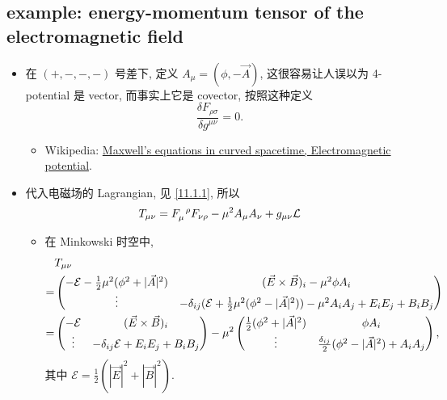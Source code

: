\subsection{example: energy-momentum tensor of the electromagnetic field} \label{subsection D.4.1}
\begin{itemize}
	\item 在 $(+, -, -, -)$ 号差下, 定义 $A_\mu = (\phi, - \vec{A})$, 这很容易让人误以为 4-potential 是 vector, 而事实上它是 covector, 按照这种定义
	\begin{equation}
		\frac{\delta F_{\rho \sigma}}{\delta g^{\mu \nu}} = 0.
	\end{equation}
	\begin{itemize}
		\item Wikipedia: \href{https://en.wikipedia.org/wiki/Maxwell%27s_equations_in_curved_spacetime#Electromagnetic_potential}{Maxwell's equations in curved spacetime, Electromagnetic potential}.
	\end{itemize}
	
	\item 代入电磁场的 Lagrangian, 见 \eqref{11.1.1}, 所以
	\begin{equation}
		T_{\mu \nu} = \tensor{F}{_\mu^\rho} F_{\nu \rho} - \mu^2 A_\mu A_\nu + g_{\mu \nu} \mathcal{L}
	\end{equation}
	
	\begin{itemize}
		\item 在 Minkowski 时空中,
		\begin{align}
			& T_{\mu \nu} \notag \\
			=& \begin{pmatrix}
				- \mathcal{E} - \frac{1}{2} \mu^2 (\phi^2 + |\vec{A}|^2) & (\vec{E} \times \vec{B})_i - \mu^2 \phi A_i \\
				\vdots & - \delta_{i j} (\mathcal{E} + \frac{1}{2} \mu^2 (\phi^2 - |\vec{A}|^2)) - \mu^2 A_i A_j + E_i E_j + B_i B_j
			\end{pmatrix} \notag \\
			=& \begin{pmatrix}
				- \mathcal{E} & (\vec{E} \times \vec{B})_i \\
				\vdots & - \delta_{i j} \mathcal{E} + E_i E_j + B_i B_j
			\end{pmatrix} - \mu^2 \begin{pmatrix}
				\frac{1}{2} (\phi^2 + |\vec{A}|^2) & \phi A_i \\
				\vdots & \frac{\delta_{i j}}{2} (\phi^2 - |\vec{A}|^2) + A_i A_j
			\end{pmatrix},
		\end{align}
		其中 $\mathcal{E} = \frac{1}{2} (|\vec{E}|^2 + |\vec{B}|^2)$.
		

\end{itemize}
\end{itemize}
